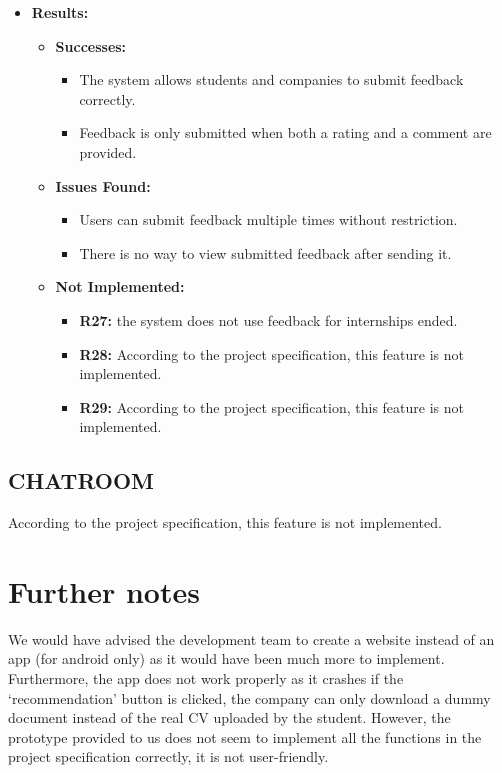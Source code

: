\begin{itemize}
    \item \textbf{Results:}
    \begin{itemize}
        \item \textbf{Successes:}
        \begin{itemize}
            \item The system allows students and companies to submit feedback correctly.
            \item Feedback is only submitted when both a rating and a comment are provided.
        \end{itemize}
        \item \textbf{Issues Found:}
        \begin{itemize}
            \item Users can submit feedback multiple times without restriction.
            \item There is no way to view submitted feedback after sending it.
        \end{itemize}
        \item \textbf{Not Implemented:}
        \begin{itemize}
            \item \textbf{R27:} the system does not use feedback for internships ended.
            \item \textbf{R28:} According to the project specification, this feature is not implemented.
            \item \textbf{R29:} According to the project specification, this feature is not implemented.
        \end{itemize}
    \end{itemize}
\end{itemize}


\subsection{CHATROOM}\label{subsec:chatroom}
According to the project specification, this feature is not implemented.


\section{Further notes}\label{sec:further-notes}
We would have advised the development team to create a website instead of an app (for android only) as it would have been much more to implement. Furthermore, the app does not work properly as it crashes if the ‘recommendation’ button is clicked, the company can only download a dummy document instead of the real CV uploaded by the student.
However, the prototype provided to us does not seem to implement all the functions in the project specification correctly, it is not user-friendly.
